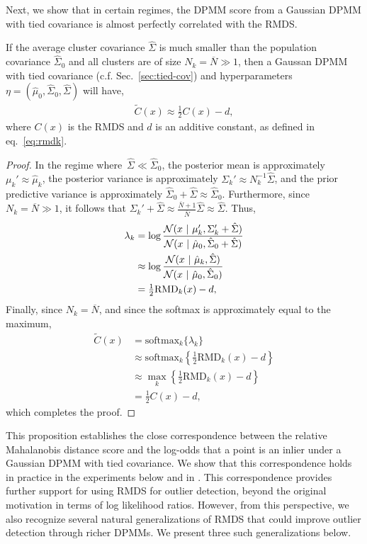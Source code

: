Next, we show that in certain regimes, the DPMM score from a Gaussian DPMM with tied covariance is almost perfectly correlated with the RMDS.

\begin{proposition}
\label{prop:rmds_tied_dpmm}
If the average cluster covariance $\hat{\Sigma}$ is much smaller than the population covariance $\hat{\Sigma}_0$ and all clusters are of size $N_k = \overline{N} \gg 1$, then a Gaussan DPMM with tied covariance (c.f. Sec.~\ref{sec:tied-cov}) and hyperparameters $\eta = (\hat{\mu}_0, \hat{\Sigma}_0, \hat{\Sigma})$ will have,
\begin{align}
    \widetilde{C}(x) \approx \tfrac{1}{2} C(x) - d,
\end{align}
where $C(x)$ is the RMDS and $d$ is an additive constant, as defined in eq.~\eqref{eq:rmdk}.
\end{proposition}

\begin{proof}
In the regime where~${\hat{\Sigma} \ll \hat{\Sigma}_0}$, the posterior mean is approximately $\mu_k' \approx \hat{\mu}_k$, the
posterior variance is approximately $\Sigma_k' \approx N_k^{-1} \hat{\Sigma}$, and the prior predictive variance is approximately $\hat{\Sigma}_0 + \hat{\Sigma} \approx \hat{\Sigma}_0$. Furthermore, since $N_k = \overline{N} \gg 1$, it follows that $\Sigma_k' + \hat{\Sigma} \approx \tfrac{\overline{N} + 1}{\overline{N}} \hat{\Sigma} \approx \hat{\Sigma}$. Thus,
\begin{align}
    \nonumber
    \lambda_k
    &= \log \frac{\mathcal{N}(x ~\vert~ \mu_k', \Sigma_k' + \hat{\Sigma})}{\mathcal{N}(x ~\vert~ \hat{\mu}_0, \hat{\Sigma}_0 + \hat{\Sigma})} \\
    \nonumber
    &\approx \log \frac{\mathcal{N}(x ~\vert~ \hat{\mu}_k, \hat{\Sigma})}{\mathcal{N}(x ~\vert~ \hat{\mu}_0, \hat{\Sigma}_0)} \\
    &= \tfrac{1}{2}\mathrm{RMD}_k(x) - d,
\end{align}
Finally, since $N_k = \overline{N}$, and since the softmax is approximately equal to the maximum,
\begin{align}
    \nonumber
    \widetilde{C}(x)
    &= \mathrm{softmax}_k \{\lambda_k\} \\
    \nonumber
    & \approx \mathrm{softmax}_k \left\{\tfrac{1}{2} \mathrm{RMD}_k(x)  - d \right\} \\
    \nonumber
    & \approx \max_k \left\{\tfrac{1}{2} \mathrm{RMD}_k(x) -d \right\} \\
    &= \tfrac{1}{2} C(x) - d,
\end{align}
which completes the proof.
\end{proof}

This proposition establishes the close correspondence between the relative Mahalanobis distance score and the log-odds that a point is an inlier under a Gaussian DPMM with tied covariance.
We show that this correspondence holds in practice in the experiments below and in .
This correspondence provides further support for using RMDS for outlier detection, beyond the original motivation in terms of log likelihood ratios.
However, from this perspective, we also recognize several natural generalizations of RMDS that could improve outlier detection through richer DPMMs.
We present three such generalizations below.
